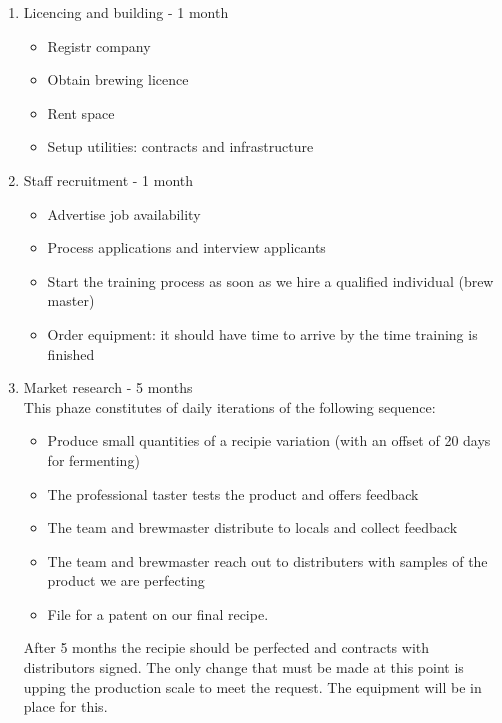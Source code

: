 \documentclass[11pt]{article}
\begin{document}
  \begin{enumerate}
  \item Licencing and building - 1 month
    \begin{itemize}
    \item Registr company
    \item Obtain brewing licence
    \item Rent space
    \item Setup utilities: contracts and infrastructure
  \end{itemize}

  \item Staff recruitment - 1 month
    \begin{itemize}
    \item Advertise job availability
    \item Process applications and interview applicants
    \item Start the training process as soon as we hire a qualified individual (brew master)
    \item Order equipment: it should have time to arrive by the time training is finished
    \end{itemize}

  \item Market research - 5 months\\
This phaze constitutes of daily iterations of the following sequence:
\begin{itemize}
\item Produce small quantities of a recipie variation (with an offset of 20 days for fermenting)
\item The professional taster tests the product and offers feedback
\item The team and brewmaster distribute to locals and collect feedback
\item The team and brewmaster reach out to distributers with samples of the product we are perfecting
\item File for a patent on our final recipe. 
\end{itemize}
\noindent After 5 months the recipie should be perfected and contracts with distributors signed. The only change that must be made at this point is upping the production scale to meet the request. The equipment will be in place for this.
  \end{enumerate}

\newpage
\end{document}
